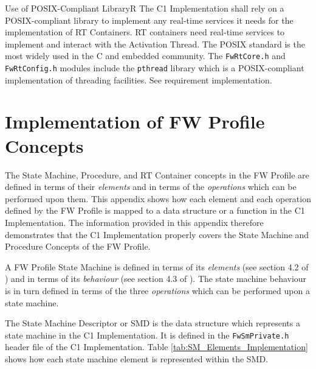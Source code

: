 \documentclass[requirements]{../fwprofile}
\begin{document}
\begin{fw_req}{Use of POSIX-Compliant Library}{R}
{The C1 Implementation shall rely on a POSIX-compliant library to implement any real-time services it needs for the implementation of RT Containers.}
{RT containers need real-time services to implement and interact with the Activation Thread. The POSIX standard is the most widely used in the C and embedded community. }
{The \texttt{FwRtCore.h} and \texttt{FwRtConfig.h} modules include the \texttt{pthread} library which is a POSIX-compliant implementation of threading facilities. } 
{See requirement implementation.}
\end{fw_req}


\setcounter{table}{0}	%

\appendix
\section{Implementation of FW Profile Concepts}
The State Machine, Procedure, and RT Container concepts in the FW Profile are defined in terms of their \emph{elements} and in terms of the \emph{operations} which can be performed upon them.
This appendix shows how each element and each operation defined by the FW Profile is 
mapped to a data structure or a function in the C1 Implementation.
The information provided in this appendix therefore demonstrates that the C1 Implementation properly covers the State Machine and Procedure Concepts of the FW Profile.

\label{Appendix_A_Implementation_SM_Concept}
A FW Profile State Machine is defined in terms of its \emph{elements} (see section 4.2 of
\cite{ref:fwprofile}) and in terms of its \emph{behaviour} (see section 4.3 of
\cite{ref:fwprofile}). 
The state machine behaviour is in turn defined in terms of the three \emph{operations} 
which can be performed upon a state machine. 

The State Machine Descriptor or SMD is the data structure which represents a state machine 
in the C1 Implementation.
It is defined in the \texttt{FwSmPrivate.h} header file of the C1 Implementation.
Table \ref{tab:SM_Elements_Implementation} shows how each state machine element is represented
within the SMD.
\end{document}
